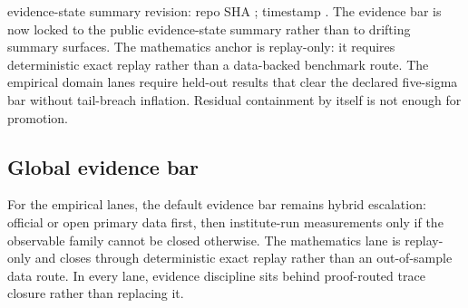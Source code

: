 evidence-state summary revision: repo SHA ; timestamp .
The evidence bar is now locked to the public evidence-state summary rather than to drifting summary surfaces. The mathematics anchor is replay-only: it requires deterministic exact replay rather than a data-backed benchmark route. The empirical domain lanes require held-out results that clear the declared five-sigma bar without tail-breach inflation. Residual containment by itself is not enough for promotion.

\subsection{Global evidence bar}
For the empirical lanes, the default evidence bar remains hybrid escalation: official or open primary data first, then institute-run measurements only if the observable family cannot be closed otherwise. The mathematics lane is replay-only and closes through deterministic exact replay rather than an out-of-sample data route. In every lane, evidence discipline sits behind proof-routed trace closure rather than replacing it.

